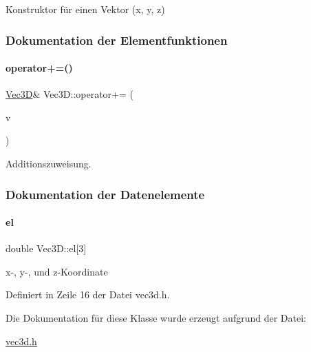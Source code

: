 Konstruktor für einen Vektor ({\ttfamily x}, {\ttfamily y}, {\ttfamily z}) 



\subsubsection{Dokumentation der Elementfunktionen}
\mbox{\label{classVec3D_a3de2f9c326c49353ee0510e49bd3f2c0}} 
\paragraph{\texorpdfstring{operator+=()}{operator+=()}}
{\footnotesize\ttfamily \mbox{\hyperlink{classVec3D}{Vec3D}}\& Vec3\+D\+::operator+= (\begin{DoxyParamCaption}\item[{const \mbox{\hyperlink{classVec3D}{Vec3D}} \&}]{v }\end{DoxyParamCaption})}



Additionszuweisung. 



\subsubsection{Dokumentation der Datenelemente}
\mbox{\label{classVec3D_ace4d2f61dbaa70bf6a125514d2d69659}} 
\paragraph{\texorpdfstring{el}{el}}
{\footnotesize\ttfamily double Vec3\+D\+::el\mbox{[}3\mbox{]}}



x-\/, y-\/, und z-\/\+Koordinate 



Definiert in Zeile 16 der Datei vec3d.\+h.



Die Dokumentation für diese Klasse wurde erzeugt aufgrund der Datei\+:\begin{DoxyCompactItemize}
\item 
\mbox{\hyperlink{vec3d_8h}{vec3d.\+h}}\end{DoxyCompactItemize}
